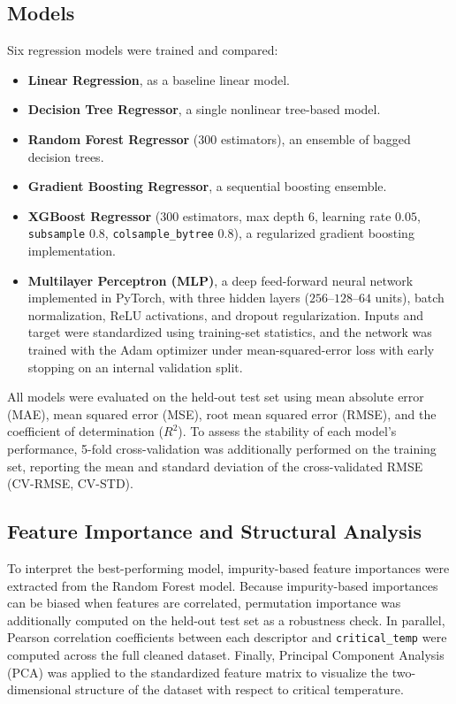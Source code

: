 \documentclass[11pt]{article}
\begin{document}
\subsection{Models}
Six regression models were trained and compared:
\begin{itemize}
  \item \textbf{Linear Regression}, as a baseline linear model.
  \item \textbf{Decision Tree Regressor}, a single nonlinear tree-based model.
  \item \textbf{Random Forest Regressor} ($300$ estimators), an ensemble of bagged decision trees.
  \item \textbf{Gradient Boosting Regressor}, a sequential boosting ensemble.
  \item \textbf{XGBoost Regressor} ($300$ estimators, max depth $6$, learning rate $0.05$,
        \texttt{subsample} $0.8$, \texttt{colsample\_bytree} $0.8$), a regularized gradient boosting
        implementation.
  \item \textbf{Multilayer Perceptron (MLP)}, a deep feed-forward neural network implemented in PyTorch,
        with three hidden layers ($256$--$128$--$64$ units), batch normalization, ReLU activations, and
        dropout regularization. Inputs and target were standardized using training-set statistics, and the
        network was trained with the Adam optimizer under mean-squared-error loss with early stopping on an
        internal validation split.
\end{itemize}

All models were evaluated on the held-out test set using mean absolute error (MAE), mean squared error
(MSE), root mean squared error (RMSE), and the coefficient of determination ($R^2$). To assess the
stability of each model's performance, 5-fold cross-validation was additionally performed on the training
set, reporting the mean and standard deviation of the cross-validated RMSE (CV-RMSE, CV-STD).

\subsection{Feature Importance and Structural Analysis}
To interpret the best-performing model, impurity-based feature importances were extracted from the Random
Forest model. Because impurity-based importances can be biased when features are correlated, permutation
importance was additionally computed on the held-out test set as a robustness check. In parallel, Pearson
correlation coefficients between each descriptor and \texttt{critical\_temp} were computed across the full
cleaned dataset. Finally, Principal Component Analysis (PCA) was applied to the standardized feature matrix
to visualize the two-dimensional structure of the dataset with respect to critical temperature.
\end{document}
